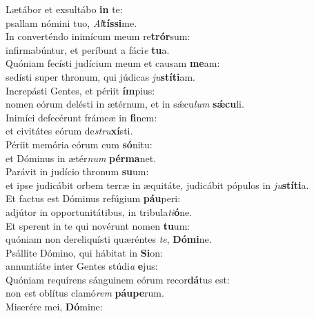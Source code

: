 \evenverse Lætábor et exsultábo \textbf{in} te:~\*\\
\evenverse psallam nómini tuo, \textit{Al}\textbf{tís}\textbf{si}me.\\
\oddverse In converténdo inimícum meum re\textbf{trór}sum:~\*\\
\oddverse infirmabúntur, et períbunt a fáci\textit{e} \textbf{tu}a.\\
\evenverse Quóniam fecísti judícium meum et causam \textbf{me}am:~\*\\
\evenverse sedísti super thronum, qui júdicas \textit{ju}\textbf{stí}\textbf{ti}am.\\
\oddverse Increpásti Gentes, et périit \textbf{ím}pius:~\*\\
\oddverse nomen eórum delésti in ætérnum, et in sǽcu\textit{lum} \textbf{sǽ}\textbf{cu}li.\\
\evenverse Inimíci defecérunt frámeæ in \textbf{fi}nem:~\*\\
\evenverse et civitátes eórum de\textit{stru}\textbf{xí}sti.\\
\oddverse Périit memória eórum cum \textbf{só}nitu:~\*\\
\oddverse et Dóminus in ætér\textit{num} \textbf{pér}\textbf{ma}net.\\
\evenverse Parávit in judício thronum \textbf{su}um:~\*\\
\evenverse et ipse judicábit orbem terræ in æquitáte, judicábit pópulos in \textit{ju}\textbf{stí}\textbf{ti}a.\\
\oddverse Et factus est Dóminus refúgium \textbf{páu}peri:~\*\\
\oddverse adjútor in opportunitátibus, in tribula\textit{ti}\textbf{ó}ne.\\
\evenverse Et sperent in te qui novérunt nomen \textbf{tu}um:~\*\\
\evenverse quóniam non dereliquísti quæréntes \textit{te}, \textbf{Dó}\textbf{mi}ne.\\
\oddverse Psállite Dómino, qui hábitat in \textbf{Si}on:~\*\\
\oddverse annuntiáte inter Gentes stúdi\textit{a} \textbf{e}jus:\\
\evenverse Quóniam requírens sánguinem eórum recor\textbf{dá}tus est:~\*\\
\evenverse non est oblítus clamó\textit{rem} \textbf{páu}\textbf{pe}rum.\\
\oddverse Miserére mei, \textbf{Dó}mine:~\*\\
